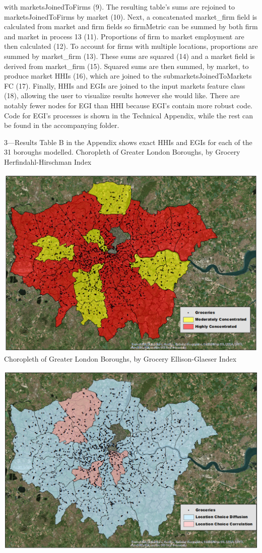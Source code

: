\documentclass[]{article}
\begin{document}
with marketsJoinedToFirms (9). The resulting table's sums are rejoined
to marketsJoinedToFirms by market (10). Next, a concatenated
market\_firm field is calculated from market and firm fields so
firmMetric can be summed by both firm and market in process 13 (11).
Proportions of firm to market employment are then calculated (12). To
account for firms with multiple locations, proportions are summed by
market\_firm (13). These sums are squared (14) and a market field is
derived from market\_firm (15). Squared sums are then summed, by market,
to produce market HHIs (16), which are joined to the
submarketsJoinedToMarkets FC (17). Finally, HHIs and EGIs are joined to
the input markets feature class (18), allowing the user to visualize
results however she would like. There are notably fewer nodes for EGI
than HHI because EGI's contain more robust code. Code for EGI's
processes is shown in the Technical Appendix, while the rest can be
found in the accompanying folder.

3---Results Table B in the Appendix shows exact HHIs and EGIs for each
of the 31 boroughs modelled. Choropleth of Greater London Boroughs, by
Grocery Herfindahl-Hirschman Index

\includegraphics[width=23.69in]{13} Choropleth of Greater London
Boroughs, by Grocery Ellison-Glaeser Index

\includegraphics[width=23.56in]{14}
\end{document}
